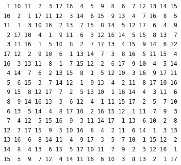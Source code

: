 \documentclass[11pt,reqno]{amsart}
\theoremstyle{plain}
\theoremstyle{definition}
\numberwithin{theorem}{section}
\begin{document}
{\footnotesize\begin{verbatim}
  1 10 11  2  3 17 16  4  5  9  8  6  7 12 13 14 15
 10  2  1 17 11 12  3 14  6 15  9 13  4  7 16  8  5
 11  1  3 10 16  2 13  7 15  8 14  5 12 17  6  4  9
  2 17 10  4  1  9 11  6  3 12 16 14  5 15  8 13  7
  3 11 16  1  5 10  8  2  7 17 13  4 15  9 14  6 12
 17 12  2  9 10  6  1 13 14  7  3  8 16  5 11 15  4
 16  3 13 11  8  1  7 15 12  2  6 17  9 10  4  5 14
  4 14  7  6  2 13 15  8  1  5 12 10  3 16  9 17 11
  5  6 15  3  7 14 12  1  9 13  4  2 11  8 17 10 16
  9 15  8 12 17  7  2  5 13 10  1 16 14  4  3 11  6
  8  9 14 16 13  3  6 12  4  1 11 15 17  2  5  7 10
  6 13  5 14  4  8 17 10  2 16 15 12  1 11  7  9  3
  7  4 12  5 15 16  9  3 11 14 17  1 13  6 10  2  8
 12  7 17 15  9  5 10 16  8  4  2 11  6 14  1  3 13
 13 16  6  8 14 11  4  9 17  3  5  7 10  1 15 12  2
 14  8  4 13  6 15  5 17 10 11  7  9  2  3 12 16  1
 15  5  9  7 12  4 14 11 16  6 10  3  8 13  2  1 17
\end{verbatim}}
\end{document}
